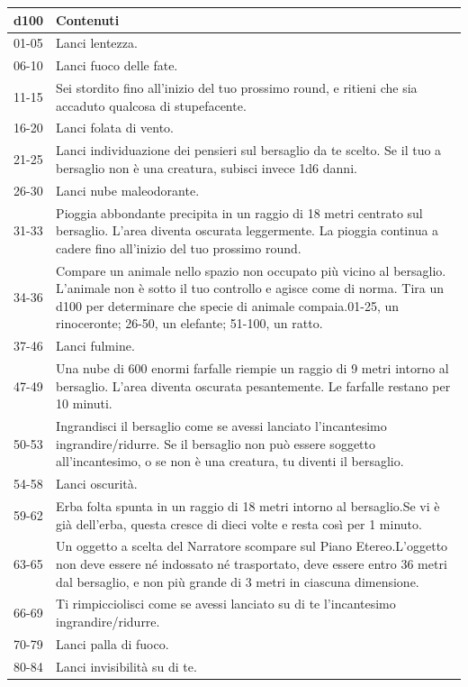 \medskip

\begin{tabularx}{0.95\textwidth}{lX}
\textbf{d100}& \textbf{Contenuti}\\
\hline
01-05 &Lanci lentezza.\\
06-10 &Lanci fuoco delle fate.\\
11-15 &Sei stordito fino all'inizio del tuo prossimo round, e ritieni che sia accaduto qualcosa di stupefacente.\\
16-20 &Lanci folata di vento.\\
21-25 &Lanci individuazione dei pensieri sul bersaglio da te scelto. Se il tuo a bersaglio non è una creatura, subisci invece 1d6 danni.\\
26-30 &Lanci nube maleodorante.\\
31-33 &Pioggia abbondante precipita in un raggio di 18 metri centrato sul bersaglio. L'area diventa oscurata leggermente. La pioggia continua a cadere fino all'inizio del tuo prossimo round.\\
34-36 &Compare un animale nello spazio non occupato più vicino al bersaglio. L'animale non è sotto il tuo controllo e agisce come di norma. Tira un d100 per determinare che specie di animale compaia.01-25, un rinoceronte; 26-50, un elefante; 51-100, un ratto.\\
37-46 &Lanci fulmine.\\
47-49 &Una nube di 600 enormi farfalle riempie un raggio di 9 metri intorno al bersaglio. L'area diventa oscurata pesantemente. Le farfalle restano per 10 minuti.\\
50-53 &Ingrandisci il bersaglio come se avessi lanciato l'incantesimo ingrandire/ridurre. Se il bersaglio non può essere soggetto all'incantesimo, o se non è una creatura, tu diventi il bersaglio.\\
54-58 &Lanci oscurità.\\
59-62 &Erba folta spunta in un raggio di 18 metri intorno al bersaglio.Se vi è già dell'erba, questa cresce di dieci volte e resta così per 1 minuto.\\
63-65 &Un oggetto a scelta del Narratore scompare sul Piano Etereo.L'oggetto non deve essere né indossato né trasportato, deve essere entro 36 metri dal bersaglio, e non più grande di 3 metri in ciascuna dimensione.\\
66-69 &Ti rimpicciolisci come se avessi lanciato su di te l'incantesimo ingrandire/ridurre.\\
70-79 &Lanci palla di fuoco.\\
80-84 &Lanci invisibilità su di te.\\

\end{tabularx}
